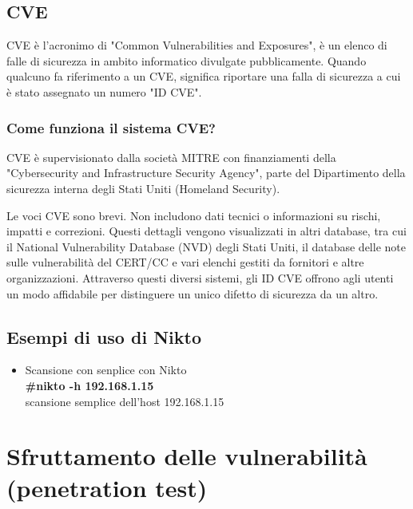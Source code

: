\documentclass[a4paper,12pt]{article}
\begin{document}
\subsection{CVE}

CVE è l'acronimo di "Common Vulnerabilities and Exposures", è un elenco di falle di sicurezza in ambito informatico divulgate pubblicamente. Quando qualcuno fa riferimento a un CVE, significa riportare una falla di sicurezza a cui è stato assegnato un numero "ID CVE".

\subsubsection{Come funziona il sistema CVE?}
CVE è supervisionato dalla società MITRE\cite{MITRE} con finanziamenti della "Cybersecurity and Infrastructure Security Agency", parte del Dipartimento della sicurezza interna degli Stati Uniti (Homeland Security).

Le voci CVE sono brevi. Non includono dati tecnici o informazioni su rischi, impatti e correzioni. Questi dettagli vengono visualizzati in altri database, tra cui il National Vulnerability Database (NVD) degli Stati Uniti, il database delle note sulle vulnerabilità del CERT/CC e vari elenchi gestiti da fornitori e altre organizzazioni. Attraverso questi diversi sistemi, gli ID CVE offrono agli utenti un modo affidabile per distinguere un unico difetto di sicurezza da un altro.

\subsection{Esempi di uso di Nikto}

\begin{itemize}

\item Scansione con senplice con Nikto \\
        \textbf{ \#nikto -h 192.168.1.15} \\
        scansione semplice dell'host 192.168.1.15
\end{itemize}

\section{  Sfruttamento delle vulnerabilità (penetration test) }
\end{document}
